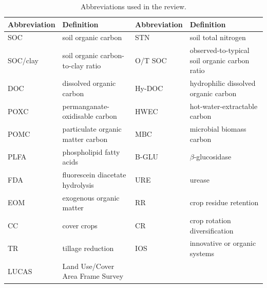 
\begin{table}[H]
  \centering
  \caption{Abbreviations used in the review.}
  \label{tab:abbreviations}
  \small
  \setlength{\tabcolsep}{2pt}
  \renewcommand{\arraystretch}{0.85}
  \begin{tabular}{@{}>{\raggedright\arraybackslash}p{}
      >{\raggedright\arraybackslash}p{}
      >{\raggedright\arraybackslash}p{}
      >{\raggedright\arraybackslash}p{}@{}}
    \hline
    \textbf{Abbreviation} & \textbf{Definition} & \textbf{Abbreviation} &
    \textbf{Definition} \\
    \hline
    SOC & soil organic carbon & STN & soil total nitrogen \\
    SOC/clay & soil organic carbon-to-clay ratio & O/T SOC &
    observed-to-typical soil organic carbon ratio \\
    DOC & dissolved organic carbon & Hy-DOC & hydrophilic dissolved organic
    carbon \\
    POXC & permanganate-oxidisable carbon & HWEC & hot-water-extractable
    carbon \\
    POMC & particulate organic matter carbon & MBC & microbial biomass carbon \\
    PLFA & phospholipid fatty acids & B-GLU & $\beta$-glucosidase \\
    FDA & fluorescein diacetate hydrolysis & URE & urease \\
    EOM & exogenous organic matter & RR & crop residue retention \\
    CC & cover crops & CR & crop rotation diversification \\
    TR & tillage reduction & IOS & innovative or organic systems \\
    LUCAS & Land Use/Cover Area Frame Survey & & \\
    \hline
  \end{tabular}
\end{table}
